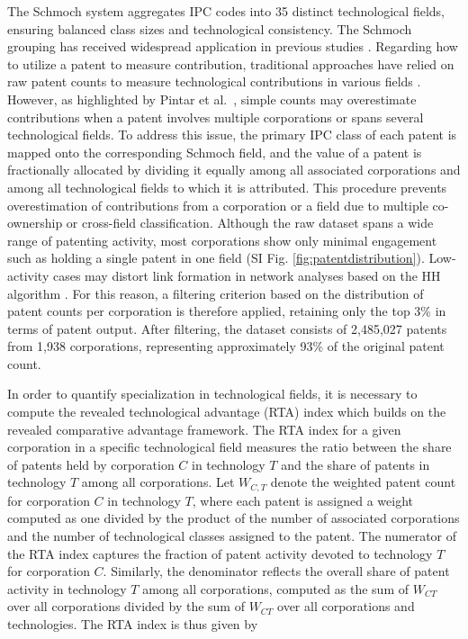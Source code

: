 \documentclass[fleqn,10pt]{wlscirep}
\begin{document}
The Schmoch system aggregates IPC codes into 35 distinct technological fields, ensuring balanced class sizes and technological consistency. The Schmoch grouping has received widespread application in previous studies \cite{PintarScherngell2022,Balland2018,Whittle2019}.
Regarding how to utilize a patent to measure contribution, traditional approaches have relied on raw patent counts to measure technological contributions in various fields \cite{Balland2016,Balland2018,PintarScherngell2022,Pinheiro2022,Whittle2019,Jun2023,Abay2024}. However, as highlighted by Pintar et al.\ \cite{PintarScherngell2022}, simple counts may overestimate contributions when a patent involves multiple corporations or spans several technological fields.
To address this issue, the primary IPC class of each patent is mapped onto the corresponding Schmoch field, and the value of a patent is fractionally allocated by dividing it equally among all associated corporations and among all technological fields to which it is attributed. This procedure prevents overestimation of contributions from a corporation or a field due to multiple co-ownership or cross-field classification.
Although the raw dataset spans a wide range of patenting activity, most corporations show only minimal engagement such as holding a single patent in one field (SI Fig. \ref{fig:patentdistribution}). 
Low-activity cases may distort link formation in network analyses based on the HH algorithm \cite{PintarScherngell2022}. 
For this reason, a filtering criterion based on the distribution of patent counts per corporation is therefore applied, retaining only the top 3\% in terms of patent output. After filtering, the dataset consists of 2,485,027 patents from 1,938 corporations, representing approximately 93\% of the original patent count.

In order to quantify specialization in technological fields, it is necessary to compute the revealed technological advantage (RTA)\cite{Soete1987} index which builds on the revealed comparative advantage framework\cite{Balassa1965}.
The RTA index for a given corporation in a specific technological field measures the ratio between the share of patents held by corporation \(C\) in technology \(T\) and the share of patents in technology \(T\) among all corporations.
Let \(W_{C,T}\) denote the weighted patent count for corporation \(C\) in technology \(T\), where each patent is assigned a weight computed as one divided by the product of the number of associated corporations and the number of technological classes assigned to the patent.
The numerator of the RTA index captures the fraction of patent activity devoted to technology \(T\) for corporation \(C\). 
Similarly, the denominator reflects the overall share of patent activity in technology \(T\) among all corporations, computed as the sum of \(W_{CT}\) over all corporations divided by the sum of \(W_{CT}\) over all corporations and technologies.
The RTA index is thus given by
\end{document}
